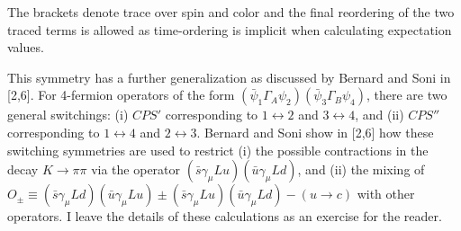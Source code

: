 The brackets denote trace over spin and color and the final reordering of the
two traced terms is allowed as time-ordering is implicit when calculating
expectation values.

This symmetry has a further generalization as discussed by Bernard and Soni in
[2,6].  For 4-fermion operators of the form $(\bar{\psi}_1\Gamma_A\psi_2)
(\bar{\psi}_3\Gamma_B\psi_4)$, there are two general switchings: (i)
$CPS'$ corresponding to $1 \leftrightarrow 2$ and $3 \leftrightarrow 4$, and
(ii) $CPS''$ corresponding to $1 \leftrightarrow 4$ and $2 \leftrightarrow 3$.
Bernard and Soni show in [2,6] how these switching symmetries are used to
restrict (i) the possible contractions in the decay $K \to \pi\pi$ via the
operator $(\bar{s}\gamma_\mu Lu)(\bar{u}\gamma_\mu Ld)$, and (ii) the mixing of
$O_\pm \equiv (\bar{s}\gamma_\mu Ld)(\bar{u}\gamma_\mu Lu) \pm
(\bar{s}\gamma_\mu Lu)(\bar{u}\gamma_\mu Ld) - (u \to c)$ with other operators.
I leave the details of these calculations as an exercise for the reader.
